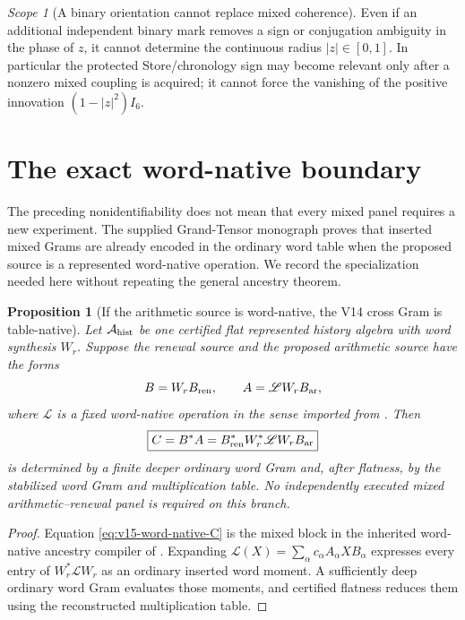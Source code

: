\documentclass[11pt]{article}
\newtheorem{proposition}[proposition]{Proposition}
\theoremstyle{definition}
\theoremstyle{remark}
\newtheorem{scope}[scope]{Scope}
\begin{document}
\begin{scope}[A binary orientation cannot replace mixed coherence]
Even if an additional independent binary mark removes a sign or conjugation
ambiguity in the phase of $z$, it cannot determine the continuous radius
$|z|\in[0,1]$.  In particular the protected Store/chronology sign may become
relevant only after a nonzero mixed coupling is acquired; it cannot force the
vanishing of the positive innovation $(1-|z|^2)I_6$.
\end{scope}

\section{The exact word-native boundary}
\label{sec:v15-word-native}

The preceding nonidentifiability does not mean that every mixed panel requires
a new experiment.  The supplied Grand-Tensor monograph proves that inserted
mixed Grams are already encoded in the ordinary word table when the proposed
source is a represented word-native operation.  We record the specialization
needed here without repeating the general ancestry theorem.

\begin{proposition}[If the arithmetic source is word-native, the V14 cross Gram is table-native]
\label{prop:v15-word-native-closure}
Let $\mathcal A_{\rm hist}$ be one certified flat represented history algebra
with word synthesis $W_r$.  Suppose the renewal source and the proposed
arithmetic source have the forms
\[
 B=W_rB_{\rm ren},
 \qquad
 A=\mathscr L W_rB_{\rm ar},
\]
where $\mathscr L$ is a fixed word-native operation in the sense imported from
\cite{GT77}.  Then
\begin{equation}
 \boxed{
 C=B^*A
 =B_{\rm ren}^*W_r^*\mathscr L W_rB_{\rm ar}}
 \label{eq:v15-word-native-C}
\end{equation}
is determined by a finite deeper ordinary word Gram and, after flatness, by
the stabilized word Gram and multiplication table.  No independently executed
mixed arithmetic--renewal panel is required on this branch.
\end{proposition}

\begin{proof}
Equation \eqref{eq:v15-word-native-C} is the mixed block in the inherited
word-native ancestry compiler of \cite{GT77}.  Expanding
$\mathscr L(X)=\sum_\alpha c_\alpha A_\alpha XB_\alpha$ expresses every entry
of $W_r^*\mathscr LW_r$ as an ordinary inserted word moment.  A sufficiently
deep ordinary word Gram evaluates those moments, and certified flatness
reduces them using the reconstructed multiplication table.
\end{proof}
\end{document}
